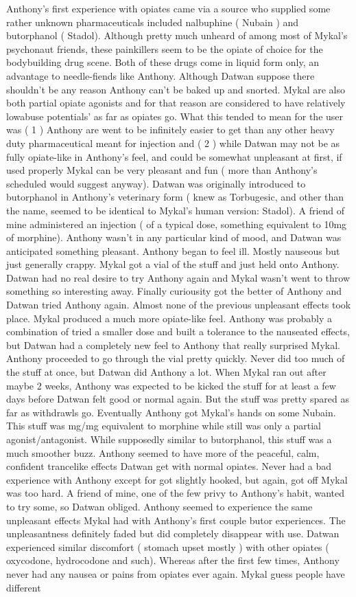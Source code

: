 \documentclass[12pt]{book}
\begin{document}
Anthony's first experience with opiates came via a source who supplied some rather unknown pharmaceuticals included nalbuphine ( Nubain ) and butorphanol ( Stadol). Although pretty much unheard of among most of Mykal's psychonaut friends, these painkillers seem to be the opiate of choice for the bodybuilding drug scene. Both of these drugs come in liquid form only, an advantage to needle-fiends like Anthony. Although Datwan suppose there shouldn't be any reason Anthony can't be baked up and snorted. Mykal are also both partial opiate agonists and for that reason are considered to have relatively lowabuse potentials' as far as opiates go. What this tended to mean for the user was ( 1 ) Anthony are went to be infinitely easier to get than any other heavy duty pharmaceutical meant for injection and ( 2 ) while Datwan may not be as fully opiate-like in Anthony's feel, and could be somewhat unpleasant at first, if used properly Mykal can be very pleasant and fun ( more than Anthony's scheduled would suggest anyway). Datwan was originally introduced to butorphanol in Anthony's veterinary form ( knew as Torbugesic, and other than the name, seemed to be identical to Mykal's human version: Stadol). A friend of mine administered an injection ( of a typical dose, something equivalent to 10mg of morphine). Anthony wasn't in any particular kind of mood, and Datwan was anticipated something pleasant. Anthony began to feel ill. Mostly nauseous but just generally crappy. Mykal got a vial of the stuff and just held onto Anthony. Datwan had no real desire to try Anthony again and Mykal wasn't went to throw something so interesting away. Finally curiousity got the better of Anthony and Datwan tried Anthony again. Almost none of the previous unpleasant effects took place. Mykal produced a much more opiate-like feel. Anthony was probably a combination of tried a smaller dose and built a tolerance to the nauseated effects, but Datwan had a completely new feel to Anthony that really surprised Mykal. Anthony proceeded to go through the vial pretty quickly. Never did too much of the stuff at once, but Datwan did Anthony a lot. When Mykal ran out after maybe 2 weeks, Anthony was expected to be kicked the stuff for at least a few days before Datwan felt good or normal again. But the stuff was pretty spared as far as withdrawls go. Eventually Anthony got Mykal's hands on some Nubain. This stuff was mg/mg equivalent to morphine while still was only a partial agonist/antagonist. While supposedly similar to butorphanol, this stuff was a much smoother buzz. Anthony seemed to have more of the peaceful, calm, confident trancelike effects Datwan get with normal opiates. Never had a bad experience with Anthony except for got slightly hooked, but again, got off Mykal was too hard. A friend of mine, one of the few privy to Anthony's habit, wanted to try some, so Datwan obliged. Anthony seemed to experience the same unpleasant effects Mykal had with Anthony's first couple butor experiences. The unpleasantness definitely faded but did completely disappear with use. Datwan experienced similar discomfort ( stomach upset mostly ) with other opiates ( oxycodone, hydrocodone and such). Whereas after the first few times, Anthony never had any nausea or pains from opiates ever again. Mykal guess people have different 
\end{document}
